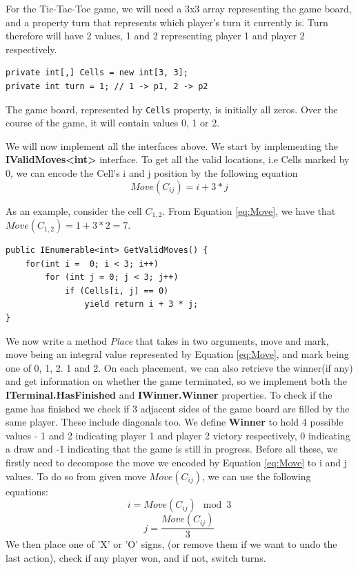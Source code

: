 For the Tic-Tac-Toe game, we will need a 3x3 array representing the game board, and a property turn that represents which player's turn it currently is. Turn therefore will have 2 values, 1 and 2 representing player 1 and player 2 respectively.

\begin{lstlisting}
private int[,] Cells = new int[3, 3];
private int turn = 1; // 1 -> p1, 2 -> p2
\end{lstlisting}

The game board, represented by \texttt{Cells} property, is initially all zeros. Over the course of the game, it will contain values 0, 1 or 2.

We will now implement all the interfaces above. We start by implementing the \textbf{IValidMoves\textless{}int\textgreater{}} interface. To get all the valid locations, i.e Cells marked by 0, we can encode the Cell's i and j position by the following equation
\begin{equation}
\label{eq:Move}
    Move(C_{ij}) = i + 3 * j
\end{equation}

As an example, consider the cell $C_{1,2}$. From Equation \ref{eq:Move}, we have that $Move(C_{1,2}) = 1 + 3 * 2 = 7$.

\begin{lstlisting}
public IEnumerable<int> GetValidMoves() {
    for(int i =  0; i < 3; i++)
        for (int j = 0; j < 3; j++)
            if (Cells[i, j] == 0)
                yield return i + 3 * j;
}
\end{lstlisting}

We now write a method \textit{Place} that takes in two arguments, move and mark, move being an integral value represented by Equation \ref{eq:Move}, and mark being one of 0, 1, 2. 1 and 2.
On each placement, we can also retrieve the winner(if any) and get information on whether the game terminated, so we implement both the \textbf{ITerminal.HasFinished} and \textbf{IWinner.Winner} properties. To check if the game has finished we check if 3 adjacent sides of the game board are filled by the same player. These include diagonals too.
We define \textbf{Winner} to hold 4 possible values - 1 and 2 indicating player 1 and player 2 victory respectively, 0 indicating a draw and -1 indicating that the game is still in progress.
Before all these, we firstly need to decompose the move we encoded by Equation \ref{eq:Move} to i and j values. To do so from given move $Move(C_{ij})$, we can use the following equations:
\begin{equation}
    i = Move(C_{ij}) \mod 3
\end{equation}
\begin{equation}
    j = \frac{Move(C_{ij})}{3}
\end{equation}
We then place one of 'X' or 'O' signs, (or remove them if we want to undo the last action), check if any player won, and if not, switch turns.

